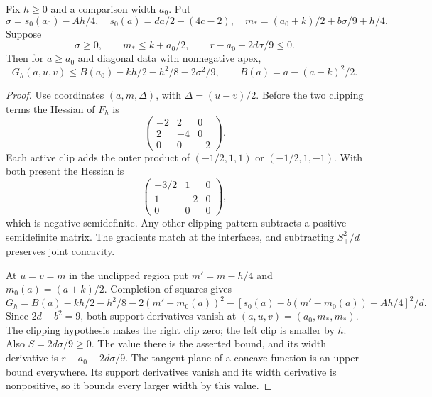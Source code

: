 \begin{lemma}\label{lem:three-tent-general-plane}
Fix $h\ge0$ and a comparison width $a_0$. Put
\[
 \sigma=s_0(a_0)-Ah/4,\quad
 s_0(a)=da/2-(4c-2),\quad
 m_*=(a_0+k)/2+b\sigma/9+h/4.
\]
Suppose
\[
 \sigma\ge0,\qquad m_*\le k+a_0/2,\qquad
 r-a_0-2d\sigma/9\le0.
\]
Then for $a\ge a_0$ and diagonal data with nonnegative apex,
\[
 G_h(a,u,v)\le
 B(a_0)-kh/2-h^2/8-2\sigma^2/9,
 \qquad B(a)=a-(a-k)^2/2.
\]
\end{lemma}
\begin{proof}
Use coordinates $(a,m,\Delta)$, with $\Delta=(u-v)/2$.
Before the two clipping terms the Hessian of $F_h$ is
\[
 \begin{pmatrix}-2&2&0\\2&-4&0\\0&0&-2\end{pmatrix}.
\]
Each active clip adds the outer product of $(-1/2,1,1)$ or
$(-1/2,1,-1)$. With both present the Hessian is
\[
 \begin{pmatrix}-3/2&1&0\\1&-2&0\\0&0&0\end{pmatrix},
\]
which is negative semidefinite. Any other clipping pattern subtracts
a positive semidefinite matrix. The gradients match at the interfaces,
and subtracting $S_+^2/d$ preserves joint concavity.

At $u=v=m$ in the unclipped region put $m'=m-h/4$ and
$m_0(a)=(a+k)/2$. Completion of squares gives
\[
 G_h=B(a)-kh/2-h^2/8-2(m'-m_0(a))^2
       -[s_0(a)-b(m'-m_0(a))-Ah/4]^2/d.
\]
Since $2d+b^2=9$, both support derivatives vanish at
$(a,u,v)=(a_0,m_*,m_*)$. The clipping hypothesis makes the
right clip zero; the left clip is smaller by $h$. Also
$S=2d\sigma/9\ge0$. The value there is the asserted bound,
and its width derivative is $r-a_0-2d\sigma/9$.
The tangent plane of a concave function is an upper bound everywhere.
Its support derivatives vanish and its width derivative is nonpositive,
so it bounds every larger width by this value.
\end{proof}

